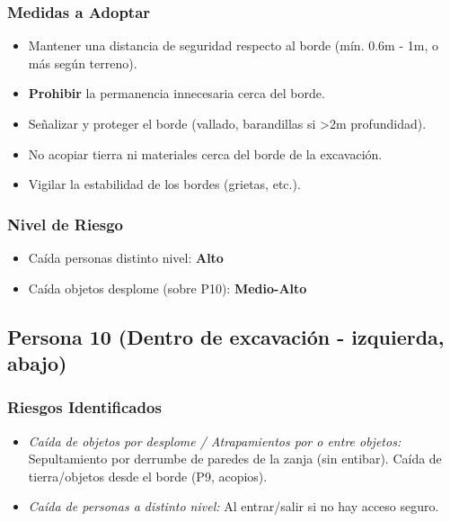 \documentclass[12pt,a4paper]{article}
\begin{document}
	\subsubsection{Medidas a Adoptar}
	\begin{itemize}
		\item Mantener una distancia de seguridad respecto al borde (mín. 0.6m - 1m, o más según terreno).
		\item \textbf{Prohibir} la permanencia innecesaria cerca del borde.
		\item Señalizar y proteger el borde (vallado, barandillas si >2m profundidad).
		\item No acopiar tierra ni materiales cerca del borde de la excavación.
		\item Vigilar la estabilidad de los bordes (grietas, etc.).
	\end{itemize}
	
	\subsubsection{Nivel de Riesgo}
	\begin{itemize}
		\item Caída personas distinto nivel: \textbf{Alto}
		\item Caída objetos desplome (sobre P10): \textbf{Medio-Alto}
	\end{itemize}
	
	\bigskip\hrulefill\bigskip
	
	\subsection{Persona 10 (Dentro de excavación - izquierda, abajo)}
	
	\subsubsection{Riesgos Identificados}
	\begin{itemize}
		\item \textit{Caída de objetos por desplome / Atrapamientos por o entre objetos:} Sepultamiento por derrumbe de paredes de la zanja (sin entibar). Caída de tierra/objetos desde el borde (P9, acopios).
		\item \textit{Caída de personas a distinto nivel:} Al entrar/salir si no hay acceso seguro.
	\end{itemize}
	
\end{document}
